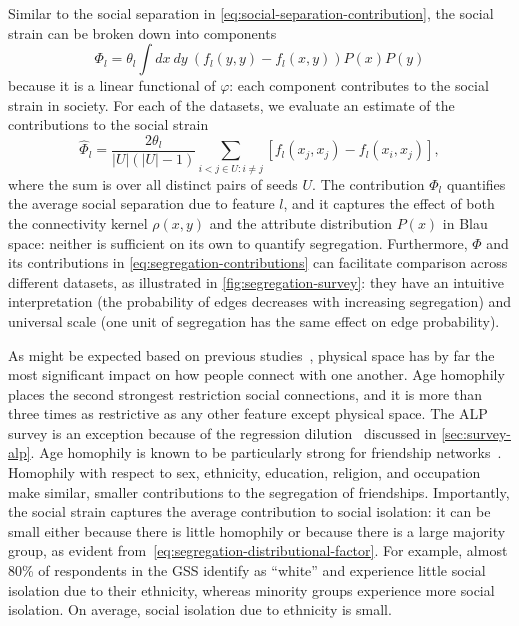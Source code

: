 \documentclass{scrartcl}
\newcommand{\card}[1]{\left|#1\right|}
\newcommand{\seeds}{U}
\begin{document}
\begin{refsection}
Similar to the social separation in \cref{eq:social-separation-contribution}, the social strain can be broken down into components
\begin{equation}
    \Phi_l = \theta_l \int dx\ dy\ \left(f_l(y, y) - f_l(x, y)\right) P(x) P(y)\label{eq:segregation-contributions}
\end{equation}
because it is a linear functional of $\varphi$: each component contributes to the social strain in society. For each of the datasets, we evaluate an estimate of the contributions to the social strain
\begin{equation*}
    \hat\Phi_l = \frac{2\theta_l}{\card{\seeds}(\card{\seeds}-1)} \sum_{i < j\in\seeds:i\neq j} \left[f_l(x_j, x_j)-f_l(x_i, x_j)\right],
\end{equation*}
where the sum is over all distinct pairs of seeds $\seeds$. The contribution $\Phi_l$ quantifies the average social separation due to feature $l$, and it captures the effect of both the connectivity kernel $\rho(x,y)$ and the attribute distribution $P(x)$ in Blau space: neither is sufficient on its own to quantify segregation. Furthermore, $\Phi$ and its contributions in \cref{eq:segregation-contributions} can facilitate comparison across different datasets, as illustrated in \cref{fig:segregation-survey}: they have an intuitive interpretation (the probability of edges decreases with increasing segregation) and universal scale (one unit of segregation has the same effect on edge probability).

As might be expected based on previous studies~\cite{Lambiotte2008, Expert2011, Backstrom2010, Scellato2011, Illenberger2013}, physical space has by far the most significant impact on how people connect with one another. Age homophily places the second strongest restriction social connections, and it is more than three times as restrictive as any other feature except physical space. The ALP survey is an exception because of the regression dilution~\cite{Hutcheon2010} discussed in \cref{sec:survey-alp}. Age homophily is known to be particularly strong for friendship networks~\cite{McPherson2001}. Homophily with respect to sex, ethnicity, education, religion, and occupation make similar, smaller contributions to the segregation of friendships. Importantly, the social strain captures the average contribution to social isolation: it can be small either because there is little homophily or because there is a large majority group, as evident from~\cref{eq:segregation-distributional-factor}. For example, almost 80\% of respondents in the GSS identify as ``white'' and experience little social isolation due to their ethnicity, whereas minority groups experience more social isolation. On average, social isolation due to ethnicity is small.


\end{refsection}
\end{document}

